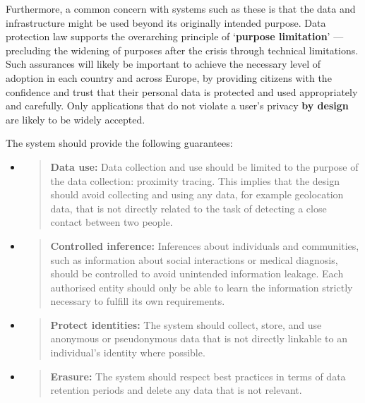 \documentclass{article}
\begin{document}
Furthermore, a common concern with systems such as these is that the
data and infrastructure might be used beyond its originally intended
purpose. Data protection law supports the overarching principle of
`\textbf{purpose limitation}' --- precluding the widening of purposes
after the crisis through technical limitations. Such assurances will
likely be important to achieve the necessary level of adoption in each
country and across Europe, by providing citizens with the confidence and
trust that their personal data is protected and used appropriately and
carefully. Only applications that do not violate a user's privacy
\textbf{\hspace{0pt}by design} are likely to be widely accepted.

The system should provide the following guarantees:

\begin{itemize}
\item
  \begin{quote}
  \textbf{Data use:} Data collection and use should be limited to the
  purpose of the data collection: proximity tracing. This implies that
  the design should avoid collecting and using any data, for example
  geolocation data, that is not directly related to the task of
  detecting a close contact between two people.
  \end{quote}
\item
  \begin{quote}
  \textbf{Controlled inference:} Inferences about individuals and
  communities, such as information about social interactions or medical
  diagnosis, should be controlled to avoid unintended information
  leakage. Each authorised entity should only be able to learn the
  information strictly necessary to fulfill its own requirements.
  \end{quote}
\item
  \begin{quote}
  \textbf{Protect identities:} The system should collect, store, and use
  anonymous or pseudonymous data that is not directly linkable to an
  individual's identity where possible.
  \end{quote}
\item
  \begin{quote}
  \textbf{Erasure:} The system should respect best practices in terms of
  data retention periods and delete any data that is not relevant.
  \end{quote}
\end{itemize}
\end{document}
